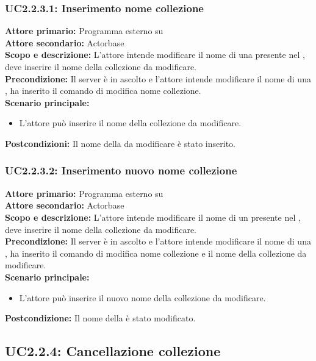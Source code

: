 \documentclass{scalatekids-article}
\begin{document}
\subsubsection{UC2.2.3.1: Inserimento nome collezione}

\textbf{Attore primario:} Programma esterno su \\
\textbf{Attore secondario:} Actorbase\\
\textbf{Scopo e descrizione:} L'attore intende modificare il nome di una  presente nel , deve inserire il nome della collezione da modificare.\\
\textbf{Precondizione:} Il server è in ascolto e l'attore intende modificare il nome di una , ha inserito il comando di modifica nome collezione.\\
\textbf{Scenario principale:}
\begin{itemize}
\item L'attore può inserire il nome della collezione da modificare.
\end{itemize}
\textbf{Postcondizioni:} Il nome della  da modificare è stato inserito.

\subsubsection{UC2.2.3.2: Inserimento nuovo nome collezione}

\textbf{Attore primario:} Programma esterno su \\
\textbf{Attore secondario:} Actorbase\\
\textbf{Scopo e descrizione:} L'attore intende modificare il nome di un  presente nel , deve inserire il nome della collezione da modificare.\\
\textbf{Precondizione:} Il server è in ascolto e l'attore intende modificare il nome di una , ha inserito il comando di modifica nome collezione e il nome della collezione da modificare.\\
\textbf{Scenario principale:}
\begin{itemize}
\item L'attore può inserire il nuovo nome della collezione da modificare.
\end{itemize}
\textbf{Postcondizione:} Il nome della  è stato modificato.

\subsection{UC2.2.4: Cancellazione collezione}
\end{document}

